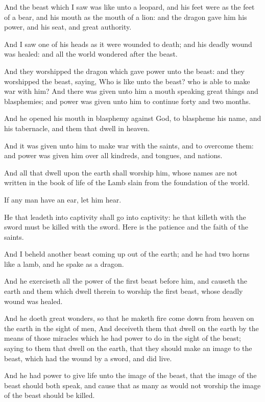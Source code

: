 \verse And the beast which I saw was like unto a leopard, and his feet were as the feet of a bear, and his mouth as the mouth of a lion: and the dragon gave him his power, and his seat, and great authority.

\verse And I saw one of his heads as it were wounded to death; and his deadly wound was healed: and all the world wondered after the beast.

\verse And they worshipped the dragon which gave power unto the beast: and they worshipped the beast, saying, Who is like unto the beast? who is able to make war with him?  \verse And there was given unto him a mouth speaking great things and blasphemies; and power was given unto him to continue forty and two months.

\verse And he opened his mouth in blasphemy against God, to blaspheme his name, and his tabernacle, and them that dwell in heaven.

\verse And it was given unto him to make war with the saints, and to overcome them: and power was given him over all kindreds, and tongues, and nations.

\verse And all that dwell upon the earth shall worship him, whose names are not written in the book of life of the Lamb slain from the foundation of the world.

\verse If any man have an ear, let him hear.

\verse He that leadeth into captivity shall go into captivity: he that killeth with the sword must be killed with the sword. Here is the patience and the faith of the saints.

\verse And I beheld another beast coming up out of the earth; and he had two horns like a lamb, and he spake as a dragon.

\verse And he exerciseth all the power of the first beast before him, and causeth the earth and them which dwell therein to worship the first beast, whose deadly wound was healed.

\verse And he doeth great wonders, so that he maketh fire come down from heaven on the earth in the sight of men, \verse And deceiveth them that dwell on the earth by the means of those miracles which he had power to do in the sight of the beast; saying to them that dwell on the earth, that they should make an image to the beast, which had the wound by a sword, and did live.

\verse And he had power to give life unto the image of the beast, that the image of the beast should both speak, and cause that as many as would not worship the image of the beast should be killed.

